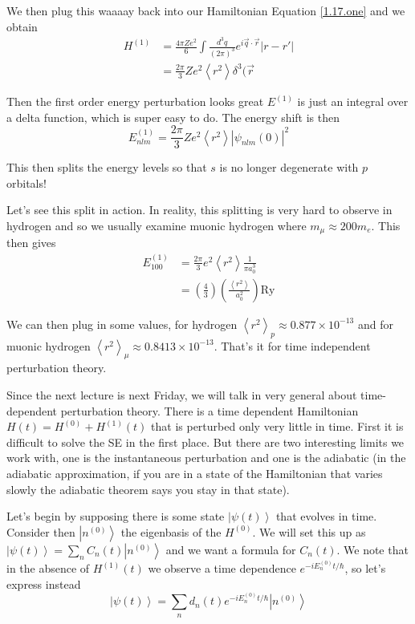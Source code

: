 \documentclass[10pt]{report}
\newcommand{\scinot}[2]{#1\times 10^{#2}}
\newcommand{\ket}[1]{\left|#1\right>}
\newcommand{\abs}[1]{\left|#1\right|}
\newcommand{\expvalue}[1]{\left<#1\right>}
\begin{document}
We then plug this waaaay back into our Hamiltonian Equation \ref{1.17.one} and we obtain
\begin{align}
    H^{(1)} &= \frac{4\pi Ze^2}{6} \int \frac{d^3q}{(2\pi)^3} e^{i\vec{q}\cdot \vec{r}}{\abs{r-r'}}\\
    &= \frac{2\pi}{3}Ze^2\expvalue{r^2}\delta^3(\vec{r}
    \label{1.17.done}
\end{align}

Then the first order energy perturbation looks great $E^{(1)}$ is just an integral over a delta function, which is super easy to do. The energy shift is then
$$E^{(1)}_{nlm} = \frac{2\pi}{3}Ze^2\expvalue{r^2}\abs{\psi_{nlm}(0)}^2$$

This then splits the energy levels so that $s$ is no longer degenerate with $p$ orbitals!

Let's see this split in action. In reality, this splitting is very hard to observe in hydrogen and so we usually examine muonic hydrogen where $m_\mu \approx 200 m_e$. This then gives
\begin{align}
    E^{(1)}_{100} &= \frac{2\pi}{3}e^2\expvalue{r^2}\frac{1}{\pi a_0^3}\\
    &= \left( \frac{4}{3} \right)\left( \frac{\expvalue{r^2}}{a_0^2} \right)\mathrm{Ry}
\end{align}

We can then plug in some values, for hydrogen $\expvalue{r^2}_p \approx\scinot{0.877}{-13}$ and for muonic hydrogen $\expvalue{r^2}_\mu \approx \scinot{0.8413}{-13}$. That's it for time independent perturbation theory. 

Since the next lecture is next Friday, we will talk in very general about time-dependent perturbation theory. There is a time dependent Hamiltonian $H(t) = H^{(0)} + H^{(1)}(t)$ that is perturbed only very little in time. First it is difficult to solve the SE in the first place. But there are two interesting limits we work with, one is the instantaneous perturbation and one is the adiabatic (in the adiabatic approximation, if you are in a state of the Hamiltonian that varies slowly the adiabatic theorem says you stay in that state).

Let's begin by supposing there is some state $\ket{\psi(t)}$ that evolves in time. Consider then $\ket{n^{(0)}}$ the eigenbasis of the $H^{(0)}$. We will set this up as $\ket{\psi(t)} = \sum_n C_n(t)\ket{n^{(0)}}$ and we want a formula for $C_n(t)$. We note that in the absence of $H^{(1)}(t)$ we observe a time dependence $e^{-iE_n^{(0)}t/\hbar}$, so let's express instead
$$\ket{\psi(t)} = \sum_n d_n(t)e^{-iE_n^{(0)}t/\hbar}\ket{n^{(0)}}$$
\end{document}
